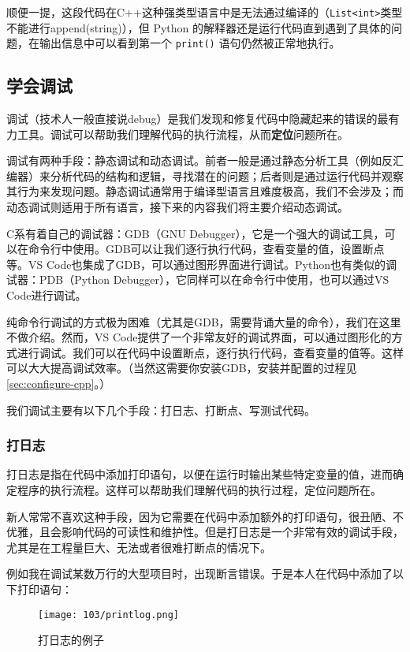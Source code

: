 顺便一提，这段代码在C++这种强类型语言中是无法通过编译的（\texttt{List<int>}类型不能进行append(string)），但 Python 的解释器还是运行代码直到遇到了具体的问题，在输出信息中可以看到第一个 \texttt{print()} 语句仍然被正常地执行。

\subsection{学会调试}\label{subsec:debugging}

调试（技术人一般直接说debug）是我们发现和修复代码中隐藏起来的错误的最有力工具。调试可以帮助我们理解代码的执行流程，从而\textbf{定位}问题所在。

调试有两种手段：静态调试和动态调试。前者一般是通过静态分析工具（例如反汇编器）来分析代码的结构和逻辑，寻找潜在的问题；后者则是通过运行代码并观察其行为来发现问题。静态调试通常用于编译型语言且难度极高，我们不会涉及；而动态调试则适用于所有语言，接下来的内容我们将主要介绍动态调试。

C系有着自己的调试器：GDB（GNU Debugger），它是一个强大的调试工具，可以在命令行中使用。GDB可以让我们逐行执行代码，查看变量的值，设置断点等。VS Code也集成了GDB，可以通过图形界面进行调试。Python也有类似的调试器：PDB（Python Debugger），它同样可以在命令行中使用，也可以通过VS Code进行调试。

纯命令行调试的方式极为困难（尤其是GDB，需要背诵大量的命令），我们在这里不做介绍。然而，VS Code提供了一个非常友好的调试界面，可以通过图形化的方式进行调试。我们可以在代码中设置断点，逐行执行代码，查看变量的值等。这样可以大大提高调试效率。（当然这需要你安装GDB，安装并配置的过程见\ref{sec:configure-cpp}。）

我们调试主要有以下几个手段：打日志、打断点、写测试代码。

\subsubsection{打日志}

打日志是指在代码中添加打印语句，以便在运行时输出某些特定变量的值，进而确定程序的执行流程。这样可以帮助我们理解代码的执行过程，定位问题所在。

新人常常不喜欢这种手段，因为它需要在代码中添加额外的打印语句，很丑陋、不优雅，且会影响代码的可读性和维护性。但是打日志是一个非常有效的调试手段，尤其是在工程量巨大、无法或者很难打断点的情况下。

例如我在调试某数万行的大型项目时，出现断言错误。于是本人在代码中添加了以下打印语句：

\begin{figure}[ht]
  \centering
  \texttt{[image: 103/printlog.png]}
  \caption{打日志的例子}
\end{figure}

